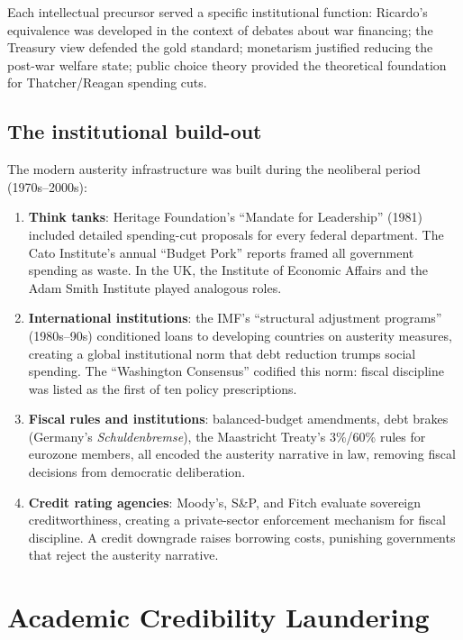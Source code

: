 Each intellectual precursor served a specific institutional function: Ricardo's equivalence was developed in the context of debates about war financing; the Treasury view defended the gold standard; monetarism justified reducing the post-war welfare state; public choice theory provided the theoretical foundation for Thatcher/Reagan spending cuts.

\subsection{The institutional build-out}

The modern austerity infrastructure was built during the neoliberal period (1970s--2000s):

\begin{enumerate}
  \item \textbf{Think tanks}: Heritage Foundation's ``Mandate for Leadership'' (1981) included detailed spending-cut proposals for every federal department. The Cato Institute's annual ``Budget Pork'' reports framed all government spending as waste. In the UK, the Institute of Economic Affairs and the Adam Smith Institute played analogous roles.

  \item \textbf{International institutions}: the IMF's ``structural adjustment programs'' (1980s--90s) conditioned loans to developing countries on austerity measures, creating a global institutional norm that debt reduction trumps social spending.
  The ``Washington Consensus'' codified this norm: fiscal discipline was listed as the first of ten policy prescriptions.

  \item \textbf{Fiscal rules and institutions}: balanced-budget amendments, debt brakes (Germany's \emph{Schuldenbremse}), the Maastricht Treaty's 3\%/60\% rules for eurozone members, all encoded the austerity narrative in law, removing fiscal decisions from democratic deliberation.

  \item \textbf{Credit rating agencies}: Moody's, S\&P, and Fitch evaluate sovereign creditworthiness, creating a private-sector enforcement mechanism for fiscal discipline. A credit downgrade raises borrowing costs, punishing governments that reject the austerity narrative.
\end{enumerate}

\section{Academic Credibility Laundering}
\label{sec:ch25-credibility}

